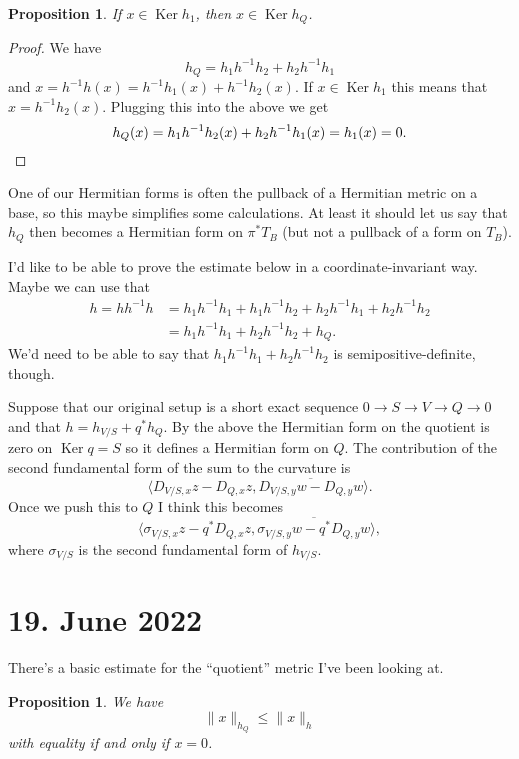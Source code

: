 \documentclass[11pt]{amsart}
\newtheorem{prop}[theo]{Proposition}
\theoremstyle{definition}
\def\ov#1{\overline{#1}}
\DeclareMathOperator{\Ker}{Ker}
\begin{document}
\begin{prop}
If $x \in \Ker h_{1}$, then $x \in \Ker h_{Q}$.
\end{prop}

\begin{proof}
We have
\[
h_{Q} = h_{1} h^{-1} h_{2} + h_{2} h^{-1} h_{1}
\]
and $x = h^{-1}h(x) = h^{-1}h_{1}(x) + h^{-1}h_{2}(x)$. If $x \in \Ker h_{1}$ this means that $x = h^{-1}h_{2}(x)$. Plugging this into the above we get
\[
h_{Q}(x)
= h_{1} h^{-1} h_{2}(x) + h_{2} h^{-1} h_{1}(x)
= h_{1}(x) = 0.
\qedhere
\]
\end{proof}

One of our Hermitian forms is often the pullback of a Hermitian metric on a base, so this maybe simplifies some calculations. At least it should let us say that $h_{Q}$ then becomes a Hermitian form on $\pi^{*}T_{B}$ (but not a pullback of a form on $T_{B}$).

I'd like to be able to prove the estimate below in a coordinate-invariant way. Maybe we can use that
\begin{align*}
h
= hh^{-1}h
&= h_{1}h^{-1}h_{1}
+ h_{1}h^{-1}h_{2}
+ h_{2}h^{-1}h_{1}
+ h_{2}h^{-1}h_{2}
\\
&= h_{1}h^{-1}h_{1}
+ h_{2}h^{-1}h_{2}
+ h_{Q}.
\end{align*}
We'd need to be able to say that $h_{1}h^{-1}h_{1} + h_{2}h^{-1}h_{2}$ is semipositive-definite, though.


Suppose that our original setup is a short exact sequence $0 \to S \to V \to Q \to 0$ and that $h = h_{V/S} + q^{*} h_{Q}$. By the above the Hermitian form on the quotient is zero on $\Ker q = S$ so it defines a Hermitian form on $Q$. The contribution of the second fundamental form of the sum to the curvature is
\[
\langle D_{V/S,x} z - D_{Q,x}z, \ov{D_{V/S,y}w - D_{Q,y}w} \rangle.
\]
Once we push this to $Q$ I think this becomes
\[
\langle \sigma_{V/S,x} z - q^{*}D_{Q,x}z, \ov{\sigma_{V/S,y}w - q^{*}D_{Q,y}w} \rangle,
\]
where $\sigma_{V/S}$ is the second fundamental form of $h_{V/S}$.


\section*{19. June 2022}

There's a basic estimate for the ``quotient'' metric I've been looking at.

\begin{prop}
  We have
  \[
    \|x\|_{h_{Q}} \leq \| x \|_{h}
  \]
  with equality if and only if $x = 0$.
\end{prop}
\end{document}
